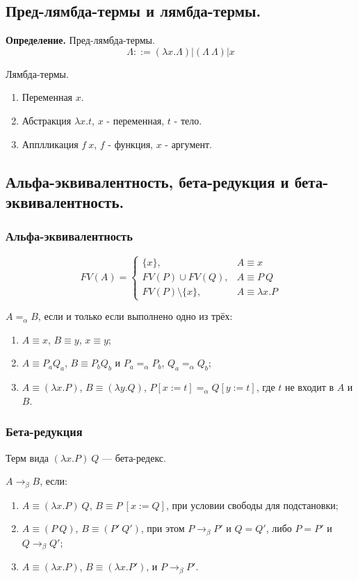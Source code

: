\documentclass[10pt,a4paper,oneside]{article}
\begin{document}
\subsection{Пред-лямбда-термы и лямбда-термы.}
{\bf Определение.} Пред-лямбда-термы.
$$\Lambda ::= (\lambda x.\Lambda) | (\Lambda\ \Lambda) | x$$

  Лямбда-термы.
\begin{enumerate}
\item Переменная $x$.
\item Абстракция $\lambda x.t$, $x$ - переменная, $t$ - тело.
\item Апплликация $f \ x$, $f$ - функция, $x$ - аргумент.
\end{enumerate}

\subsection{Альфа-эквивалентность, бета-редукция
и бета-эквивалентность.}
\subsubsection{Альфа-эквивалентность}
$$FV(A) = \left\{\begin{array}{ll} \{x\}, & A \equiv x\\
  FV(P)\cup FV(Q), & A \equiv P\ Q\\
  FV(P)\setminus\{x\}, & A \equiv \lambda x.P\end{array}\right.$$

 $A=_\alpha B$, если и только если выполнено одно из трёх:
\begin{enumerate}
\item $A \equiv x$, $B \equiv y$, $x \equiv y$;
\item $A \equiv P_a Q_a$, $B \equiv P_b Q_b$ и $P_a =_\alpha P_b$, $Q_a =_\alpha Q_b$;
\item $A \equiv (\lambda x.P)$, $B \equiv (\lambda y.Q)$, $P[x := t] =_\alpha Q[y := t]$, где $t$ не входит в $A$ и $B$.
\end{enumerate}

\subsubsection{Бета-редукция}
  Терм вида $(\lambda x.P)\ Q$ --- бета-редекс.

  $A \rightarrow_\beta B$, если:
\begin{enumerate}
\item $A \equiv (\lambda x.P)\ Q$, $B \equiv P\ [x := Q]$, при условии свободы для подстановки;
\item $A \equiv (P\ Q)$, $B \equiv (P'\ Q')$, при этом $P \rightarrow_\beta P'$ и $Q = Q'$, либо $P = P'$ и $Q \rightarrow_\beta Q'$;
\item $A \equiv (\lambda x.P)$, $B \equiv (\lambda x.P')$, и $P \rightarrow_\beta P'$.
\end{enumerate}
\end{document}
